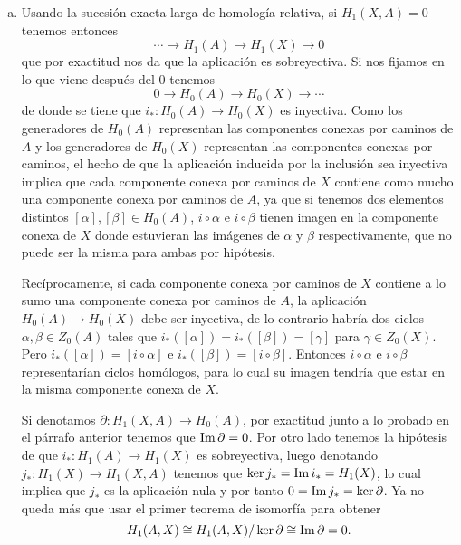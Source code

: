 \documentclass[twoside]{article}
\begin{document}
\begin{solucion}
\begin{enumerate}[(a)]
\item Usando la sucesión exacta larga de homología relativa, si $H_1(X,A)=0$ tenemos entonces
\[
\cdots\to H_1(A)\to H_1(X)\to 0
\]
que por exactitud nos da que la aplicación es sobreyectiva. Si nos fijamos en lo que viene después del 0 tenemos
\[
0\to H_0(A)\to H_0(X)\to\cdots
\]
de donde se tiene que $i_*:H_0(A)\to H_0(X)$ es inyectiva. Como los generadores de $H_0(A)$ representan las componentes conexas por caminos de $A$ y los generadores de $H_0(X)$ representan las componentes conexas por caminos, el hecho de que la aplicación inducida por la inclusión sea inyectiva implica que cada componente conexa por caminos de $X$ contiene como mucho una componente conexa por caminos de $A$, ya que si tenemos dos elementos distintos $[\alpha],[\beta]\in H_0(A)$, $i\circ\alpha$ e $i\circ\beta$ tienen imagen en la componente conexa de $X$ donde estuvieran las imágenes de $\alpha$ y $\beta$ respectivamente, que no puede ser la misma para ambas por hipótesis. 

Recíprocamente, si cada componente conexa por caminos de $X$ contiene a lo sumo una componente conexa por caminos de $A$, la aplicación $H_0(A)\to H_0(X)$ debe ser inyectiva, de lo contrario habría dos ciclos $\alpha,\beta\in Z_0(A)$ tales que $i_*([\alpha])=i_*([\beta])=[\gamma]$ para $\gamma\in Z_0(X)$. Pero $i_*([\alpha])=[i\circ\alpha]$ e $i_*([\beta])=[i\circ\beta]$. Entonces $i\circ\alpha$ e $i\circ\beta$ representarían ciclos homólogos, para lo cual su imagen tendría que estar en la misma componente conexa de $X$. 

Si denotamos $\partial:H_1(X,A)\to H_0(A)$, por exactitud junto a lo probado en el párrafo anterior tenemos que $\operatorname{Im}\partial=0$. Por otro lado tenemos la hipótesis de que $i_*:H_1(A)\to H_1(X)$ es sobreyectiva, luego denotando $j_*:H_1(X)\to H_1(X,A)$ tenemos que $\ker j_*=\operatorname{Im} i_*=H_1(X)$, lo cual implica que $j_*$ es la aplicación nula y por tanto $0=\operatorname{Im} j_*=\ker\partial$. Ya no queda más que usar el primer teorema de isomorfía para obtener $$H_1(A,X)\cong H_1(A,X)/\ker\partial\cong \operatorname{Im}\partial=0.$$
\end{enumerate}
\end{solucion}
\end{document}
